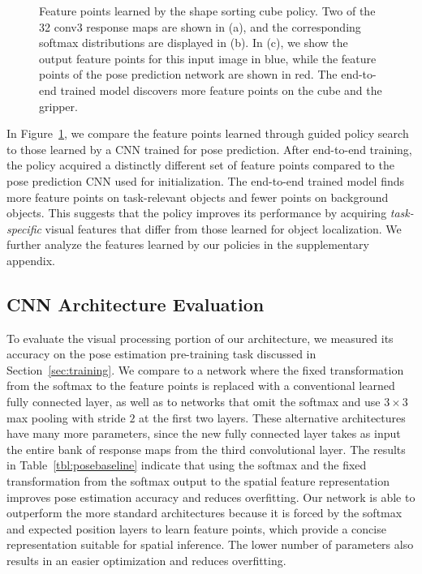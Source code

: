 \documentclass[conference]{IEEEtran}
\begin{document}
\begin{figure}
\begin{picture}
\end{picture}
\caption{Feature points learned by the shape sorting cube policy. Two of the 32 conv3 response maps are shown in (a), and the corresponding softmax distributions are displayed in (b). In (c), we show the output feature points for this input image in blue, while the feature points of the pose prediction network are shown in red. The end-to-end trained model discovers more feature points on the cube and the gripper.}
\label{fig:comppoints}
\vspace{-0.2in}
\end{figure}

In Figure~\ref{fig:comppoints}, we compare the feature points learned through guided policy search to those learned by a CNN trained for pose prediction. After end-to-end training, the policy acquired a distinctly different set of feature points compared to the pose prediction CNN used for initialization. The end-to-end trained model finds more feature points on task-relevant objects and fewer points on background objects. This suggests that the policy improves its performance by acquiring \emph{task-specific} visual features that differ from those learned for object localization. We further analyze the features learned by our policies in the supplementary appendix.

\subsection{CNN Architecture Evaluation}
\label{sec:poseeval}

To evaluate the visual processing portion of our architecture, we measured its accuracy on the pose estimation pre-training task discussed in Section~\ref{sec:training}. We compare to a network where the fixed transformation from the softmax to the feature points is replaced with a conventional learned fully connected layer, as well as to networks that omit the softmax and use $3\times 3$ max pooling with stride $2$ at the first two layers. These alternative architectures have many more parameters, since the new fully connected layer takes as input the entire bank of response maps from the third convolutional layer.
The results in Table~\ref{tbl:posebaseline} indicate that using the softmax and the fixed transformation from the softmax output to the spatial feature representation improves pose estimation accuracy and reduces overfitting. Our network is able to outperform the more standard architectures because it is forced by the softmax and expected position layers to learn feature points, which provide a concise representation suitable for spatial inference. The lower number of parameters also results in an easier optimization and reduces overfitting.
\end{document}
